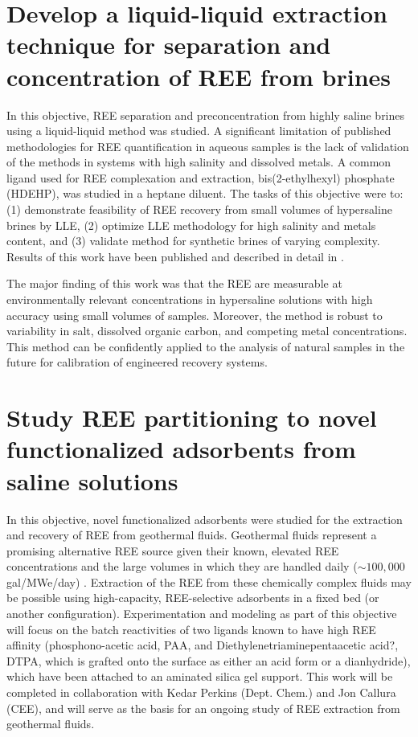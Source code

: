 \section{Develop a liquid-liquid extraction technique for separation and concentration of REE from brines}

In this objective, REE separation and preconcentration from highly saline brines using a liquid-liquid method was studied.
A significant limitation of published methodologies for REE quantification in aqueous samples is the lack of validation of the methods in systems with high salinity and dissolved metals.
A common ligand used for REE complexation and extraction, bis(2-ethylhexyl) phosphate (HDEHP), was studied in a heptane diluent. 
The tasks of this objective were to: (1) demonstrate feasibility of REE recovery from small volumes of hypersaline brines by LLE, (2) optimize LLE methodology for high salinity and metals content, and (3) validate method for synthetic brines of varying complexity.
Results of this work have been published and described in detail in \citet{Noack_EST_2015}.

The major finding of this work was that the REE are measurable at environmentally relevant concentrations in hypersaline solutions with high accuracy using small volumes of samples.
Moreover, the method is robust to variability in salt, dissolved organic carbon, and competing metal concentrations.
This method can be confidently applied to the analysis of natural samples in the future for calibration of engineered recovery systems.

\section{Study REE partitioning to novel functionalized adsorbents from saline solutions}

In this objective, novel functionalized adsorbents were studied for the extraction and recovery of REE from geothermal fluids.
Geothermal fluids represent a promising alternative REE source given their known, elevated REE concentrations \citep{Michard_GCA_1989, Lewis_GCA_1997} and the large volumes in which they are handled daily ($\sim 100,000$ gal/MWe/day) \citep{CDOGGR}.
Extraction of the REE from these chemically complex fluids may be possible using high-capacity, REE-selective adsorbents in a fixed bed (or another configuration).
Experimentation and modeling as part of this objective will focus on the batch reactivities of two ligands known to have high REE affinity (phosphono-acetic acid, PAA, and Diethylenetriaminepentaacetic acid?, DTPA, which is grafted onto the surface as either an acid form or a dianhydride), which have been attached to an aminated silica gel support.
This work will be completed in collaboration with Kedar Perkins (Dept. Chem.) and Jon Callura (CEE), and will serve as the basis for an ongoing study of REE extraction from geothermal fluids.

